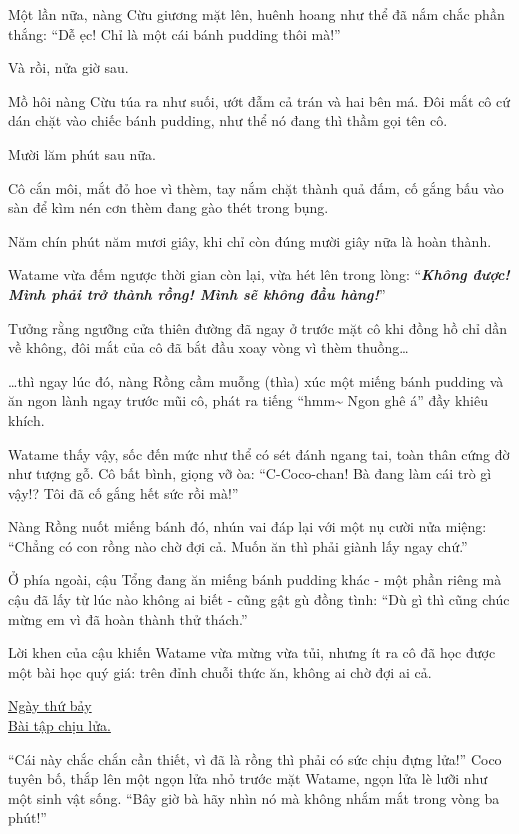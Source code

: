 \documentclass[../main.tex]{subfiles}
\begin{document}
Một lần nữa, nàng Cừu giương mặt lên, huênh hoang như thể đã nắm chắc phần thắng: ``Dễ ẹc! Chỉ là một cái bánh pudding thôi mà!''

Và rồi, nửa giờ sau.

Mồ hôi nàng Cừu túa ra như suối, ướt đẫm cả trán và hai bên má. Đôi mắt cô cứ dán chặt vào chiếc bánh pudding, như thể nó đang thì thầm gọi tên cô.

Mười lăm phút sau nữa.

Cô cắn môi, mắt đỏ hoe vì thèm, tay nắm chặt thành quả đấm, cố gắng bấu vào sàn để kìm nén cơn thèm đang gào thét trong bụng.

Năm chín phút năm mươi giây, khi chỉ còn đúng mười giây nữa là hoàn thành.

Watame vừa đếm ngược thời gian còn lại, vừa hét lên trong lòng: ``\textit{\textbf{Không được! Mình phải trở thành rồng! Mình sẽ không đầu hàng!}}''

Tưởng rằng ngưỡng cửa thiên đường đã ngay ở trước mặt cô khi đồng hồ chỉ dần về không, đôi mắt của cô đã bắt đầu xoay vòng vì thèm thuồng\dots

\dots thì ngay lúc đó, nàng Rồng cầm muỗng (thìa) xúc một miếng bánh pudding và ăn ngon lành ngay trước mũi cô, phát ra tiếng ``hmm\~{} Ngon ghê á{}'' đầy khiêu khích.

Watame thấy vậy, sốc đến mức như thể có sét đánh ngang tai, toàn thân cứng đờ như tượng gỗ. Cô bất bình, giọng vỡ òa: ``C-Coco-chan! Bà đang làm cái trò gì vậy!? Tôi đã cố gắng hết sức rồi mà!''

Nàng Rồng nuốt miếng bánh đó, nhún vai đáp lại với một nụ cười nửa miệng: ``Chẳng có con rồng nào chờ đợi cả. Muốn ăn thì phải giành lấy ngay chứ.''

Ở phía ngoài, cậu Tổng đang ăn miếng bánh pudding khác - một phần riêng mà cậu đã lấy từ lúc nào không ai biết - cũng gật gù đồng tình: ``Dù gì thì cũng chúc mừng em vì đã hoàn thành thử thách.''

Lời khen của cậu khiến Watame vừa mừng vừa tủi, nhưng ít ra cô đã học được một bài học quý giá: trên đỉnh chuỗi thức ăn, không ai chờ đợi ai cả.

\begin{center}
  \uline{Ngày thứ bảy\\Bài tập chịu lửa.}
\end{center}

``Cái này chắc chắn cần thiết, vì đã là rồng thì phải có sức chịu đựng lửa!'' Coco tuyên bố, thắp lên một ngọn lửa nhỏ trước mặt Watame, ngọn lửa lè lưỡi như một sinh vật sống. ``Bây giờ bà hãy nhìn nó mà không nhắm mắt trong vòng ba phút!''
\end{document}
